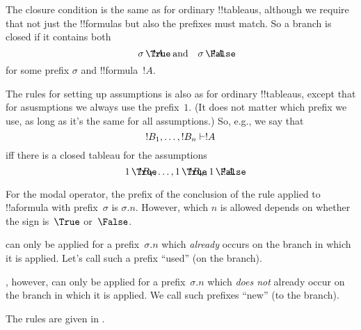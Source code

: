 \documentclass[../../../include/open-logic-section]{subfiles}
\begin{document}
The closure condition is the same as for ordinary !!{tableau}s,
although we require that not just the !!{formula}s but also the
prefixes must match. So a branch is closed if it contains both
\[
\sFmla{\True}{!A}[\sigma] \quad\text{and}\quad \sFmla{\False}{!A}[\sigma]
\]
for some prefix $\sigma$ and !!{formula}~$!A$.

The rules for setting up assumptions is also as for ordinary
!!{tableau}s, except that for asusmptions we always use the
prefix~$1$. (It does not matter which prefix we use, as long as it's
the same for all assumptions.) So, e.g., we say that
\[
!B_1, \dots, !B_n \Proves !A
\]
iff there is a closed tableau for the assumptions
\[
\sFmla{\True}{!B_1}[1], \dots, \sFmla{\True}{!B_n}[1],
\sFmla{\False}{!A}[1].
\]

For the modal operator, the prefix of
the conclusion of the rule applied to !!a{formula} with
prefix~$\sigma$ is $\sigma.n$. However, which $n$ is allowed depends
on whether the sign is~$\True$ or~$\False$.
  
 can only be applied for a
prefix~$\sigma.n$ which \emph{already} occurs on the branch in which
it is applied. Let's call such a prefix ``used'' (on the branch).

, however, can
only be applied for a prefix~$\sigma.n$ which \emph{does not} already
occur on the branch in which it is applied. We call such prefixes
``new'' (to the branch).

The rules are given in .
\end{document}
